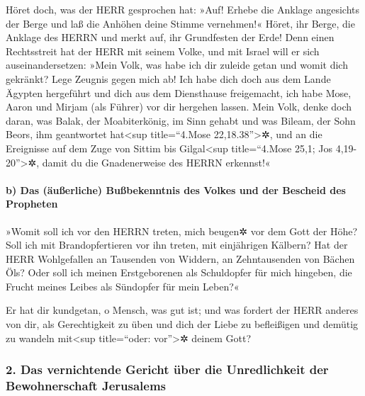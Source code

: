Höret doch, was der HERR gesprochen hat: »Auf! Erhebe die
Anklage angesichts der Berge und laß die Anhöhen deine Stimme
vernehmen!« Höret, ihr Berge, die Anklage des HERRN und
merkt auf, ihr Grundfesten der Erde! Denn einen Rechtsstreit hat der
HERR mit seinem Volke, und mit Israel will er sich auseinandersetzen:
»Mein Volk, was habe ich dir zuleide getan und womit dich
gekränkt? Lege Zeugnis gegen mich ab! Ich habe dich doch
aus dem Lande Ägypten hergeführt und dich aus dem Diensthause
freigemacht, ich habe Mose, Aaron und Mirjam (als Führer) vor dir
hergehen lassen. Mein Volk, denke doch daran, was Balak,
der Moabiterkönig, im Sinn gehabt und was Bileam, der Sohn Beors, ihm
geantwortet hat\textless sup title=``4.Mose 22,18.38''\textgreater✲, und
an die Ereignisse auf dem Zuge von Sittim bis Gilgal\textless sup
title=``4.Mose 25,1; Jos 4,19-20''\textgreater✲, damit du die
Gnadenerweise des HERRN erkennst!«

\hypertarget{b-das-uxe4uuxdferliche-buuxdfbekenntnis-des-volkes-und-der-bescheid-des-propheten}{%
\paragraph{b) Das (äußerliche) Bußbekenntnis des Volkes und der Bescheid
des
Propheten}\label{b-das-uxe4uuxdferliche-buuxdfbekenntnis-des-volkes-und-der-bescheid-des-propheten}}

»Womit soll ich vor den HERRN treten, mich beugen✲ vor dem
Gott der Höhe? Soll ich mit Brandopfertieren vor ihn treten, mit
einjährigen Kälbern? Hat der HERR Wohlgefallen an
Tausenden von Widdern, an Zehntausenden von Bächen Öls? Oder soll ich
meinen Erstgeborenen als Schuldopfer für mich hingeben, die Frucht
meines Leibes als Sündopfer für mein Leben?«

Er hat dir kundgetan, o Mensch, was gut ist; und was
fordert der HERR anderes von dir, als Gerechtigkeit zu üben und dich der
Liebe zu befleißigen und demütig zu wandeln mit\textless sup
title=``oder: vor''\textgreater✲ deinem Gott?

\hypertarget{das-vernichtende-gericht-uxfcber-die-unredlichkeit-der-bewohnerschaft-jerusalems}{%
\subsubsection{2. Das vernichtende Gericht über die Unredlichkeit der
Bewohnerschaft
Jerusalems}\label{das-vernichtende-gericht-uxfcber-die-unredlichkeit-der-bewohnerschaft-jerusalems}}


